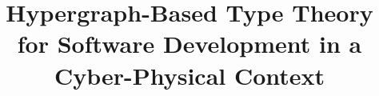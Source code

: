 \documentclass[11pt, twocolumn]{article}
\begin{document}
\title{Hypergraph-Based Type Theory 
for Software Development in a Cyber-Physical Context}
\end{document}
